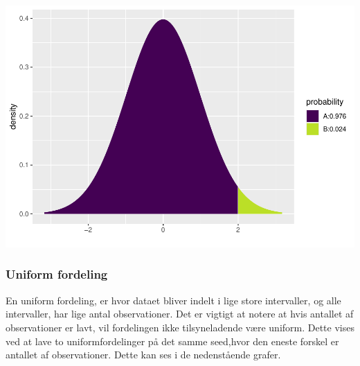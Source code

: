 \documentclass[
]{article}
\begin{document}
\includegraphics{TP2_files/figure-latex/unnamed-chunk-14-1.pdf}

\hypertarget{uniform-fordeling}{%
\subsubsection{Uniform fordeling}\label{uniform-fordeling}}

En uniform fordeling, er hvor dataet bliver indelt i lige store
intervaller, og alle intervaller, har lige antal observationer. Det er
vigtigt at notere at hvis antallet af observationer er lavt, vil
fordelingen ikke tilsyneladende være uniform. Dette vises ved at lave to
uniformfordelinger på det samme seed,hvor den eneste forskel er antallet
af observationer. Dette kan ses i de nedenstående grafer.
\end{document}
